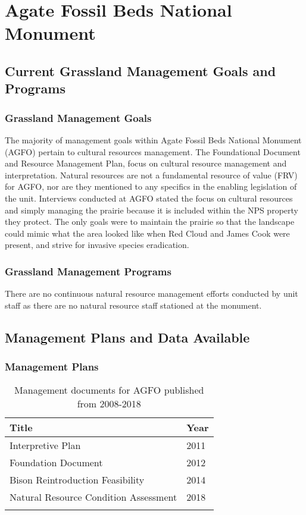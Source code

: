 \section{Agate Fossil Beds National Monument}

\subsection{Current Grassland Management Goals and Programs}

\subsubsection{Grassland Management Goals}

The majority of management goals within Agate Fossil Beds National
Monument (AGFO) pertain to cultural resources management. The
Foundational Document and Resource Management Plan, focus on cultural
resource management and interpretation. Natural resources are not a
fundamental resource of value (FRV) for AGFO, nor are they mentioned to
any specifics in the enabling legislation of the unit. Interviews
conducted at AGFO stated the focus on cultural resources and simply
managing the prairie because it is included within the NPS property they
protect. The only goals were to maintain the prairie so that the
landscape could mimic what the area looked like when Red Cloud and James
Cook were present, and strive for invasive species eradication.

\subsubsection{Grassland Management Programs}

There are no continuous natural resource management efforts conducted by
unit staff as there are no natural resource staff stationed at the
monument.

\subsection{Management Plans and Data Available}

\subsubsection{Management Plans}

\begin{longtable}[]{@{}ll@{}}
\toprule
Title & Year\tabularnewline
\midrule
\endhead
Interpretive Plan & 2011 \tabularnewline
Foundation Document & 2012 \tabularnewline
Bison Reintroduction Feasibility & 2014 \tabularnewline
Natural Resource Condition Assessment &
2018 \tabularnewline
\bottomrule
\caption{Management documents for AGFO published from 2008-2018}\label{tab:AGFOManDocs}
\end{longtable}

